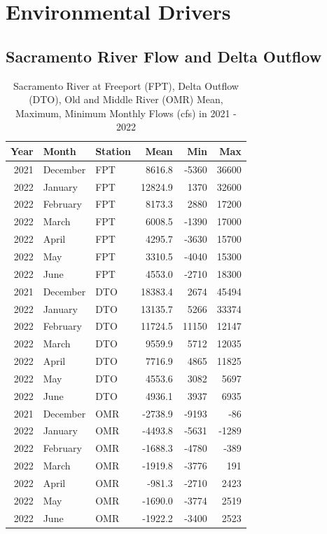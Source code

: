 \documentclass[
]{book}
\theoremstyle{definition}
\theoremstyle{definition}
\theoremstyle{definition}
\theoremstyle{definition}
\theoremstyle{remark}
\begin{document}
\hypertarget{environmental-drivers-3}{%
\section{Environmental Drivers}\label{environmental-drivers-3}}

\hypertarget{sacramento-river-flow-and-delta-outflow}{%
\subsection{Sacramento River Flow and Delta Outflow}\label{sacramento-river-flow-and-delta-outflow}}

\begin{table}
\centering
\caption{Sacramento River at Freeport (FPT), Delta Outflow (DTO), Old and Middle River (OMR) Mean, Maximum, Minimum Monthly Flows (cfs) in 2021 - 2022}
\centering
\begin{tabular}[t]{rllrrr}
\hline
Year & Month & Station & Mean & Min & Max\\
\hline
2021 & December & FPT & 8616.8 & -5360 & 36600\\
\hline
2022 & January & FPT & 12824.9 & 1370 & 32600\\
\hline
2022 & February & FPT & 8173.3 & 2880 & 17200\\
\hline
2022 & March & FPT & 6008.5 & -1390 & 17000\\
\hline
2022 & April & FPT & 4295.7 & -3630 & 15700\\
\hline
2022 & May & FPT & 3310.5 & -4040 & 15300\\
\hline
2022 & June & FPT & 4553.0 & -2710 & 18300\\
\hline
2021 & December & DTO & 18383.4 & 2674 & 45494\\
\hline
2022 & January & DTO & 13135.7 & 5266 & 33374\\
\hline
2022 & February & DTO & 11724.5 & 11150 & 12147\\
\hline
2022 & March & DTO & 9559.9 & 5712 & 12035\\
\hline
2022 & April & DTO & 7716.9 & 4865 & 11825\\
\hline
2022 & May & DTO & 4553.6 & 3082 & 5697\\
\hline
2022 & June & DTO & 4936.1 & 3937 & 6935\\
\hline
2021 & December & OMR & -2738.9 & -9193 & -86\\
\hline
2022 & January & OMR & -4493.8 & -5631 & -1289\\
\hline
2022 & February & OMR & -1688.3 & -4780 & -389\\
\hline
2022 & March & OMR & -1919.8 & -3776 & 191\\
\hline
2022 & April & OMR & -981.3 & -2710 & 2423\\
\hline
2022 & May & OMR & -1690.0 & -3774 & 2519\\
\hline
2022 & June & OMR & -1922.2 & -3400 & 2523\\
\hline
\end{tabular}
\end{table}
\end{document}
